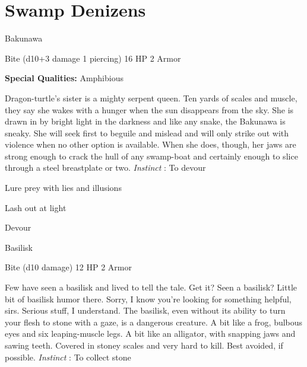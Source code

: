 \chapter{Swamp Denizens}
   
 


\startMonsterName
Bakunawa	 
\stopMonsterName
 

Bite (d10+3 damage 1 piercing)	16 HP	2 Armor

 


 
\startMonsterQualities
{\bf Special Qualities:}  Amphibious
\stopMonsterQualities
 
\startMonsterDescription
Dragon-turtle’s sister is a mighty serpent queen. Ten yards of scales and muscle, they say she wakes with a hunger when the sun disappears from the sky. She is drawn in by bright light in the darkness and like any snake, the Bakunawa is sneaky. She will seek first to beguile and mislead and will only strike out with violence when no other option is available. When she does, though, her jaws are strong enough to crack the hull of any swamp-boat and certainly enough to slice through a steel breastplate or two. {\em Instinct} : To devour
\stopMonsterDescription
 
\startitemize[1,packed]

\item Lure prey with lies and illusions

 
\item Lash out at light

 
\item Devour


\stopitemize
 
\startMonsterName
Basilisk	 
\stopMonsterName
 

Bite (d10 damage)	12 HP	2 Armor

 


 
\startMonsterDescription
Few have seen a basilisk and lived to tell the tale. Get it? Seen a basilisk? Little bit of basilisk humor there. Sorry, I know you’re looking for something helpful, sirs. Serious stuff, I understand. The basilisk, even without its ability to turn your flesh to stone with a gaze, is a dangerous creature. A bit like a frog, bulbous eyes and six leaping-muscle legs. A bit like an alligator, with snapping jaws and sawing teeth. Covered in stoney scales and very hard to kill. Best avoided, if possible. {\em Instinct} : To collect stone
\stopMonsterDescription
 
